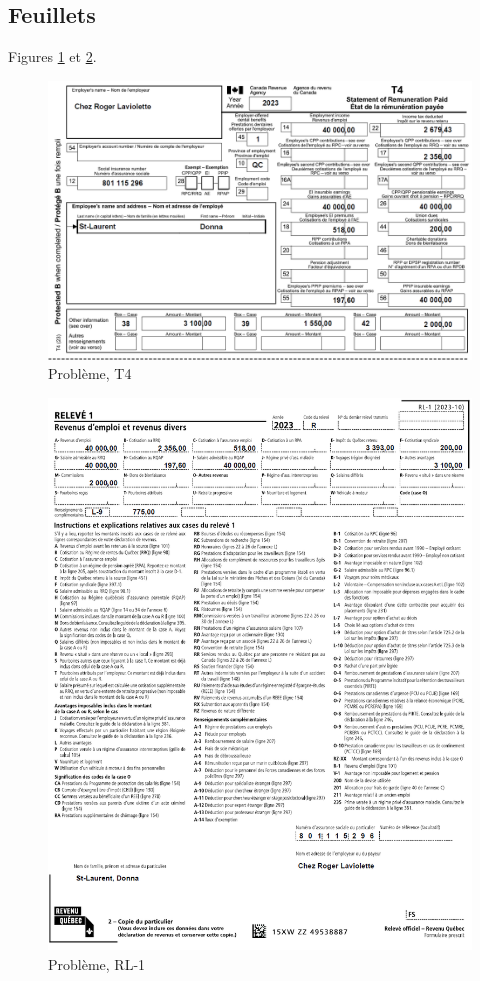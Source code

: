 \subsection{Feuillets}
Figures \ref{fig:chap3ProblemeT4} et \ref{fig:chap3ProblemeRL1}.
\begin{figure}
	\centering
	\includegraphics[width=.9\textwidth]{probleme/chapitre-3/T4.png}
	\caption{Problème, T4}
	\label{fig:chap3ProblemeT4}
\end{figure}
\begin{figure}
	\centering
	\includegraphics[width=.9\textwidth]{probleme/chapitre-3/RL1.png}
	\caption{Problème, RL-1}
	\label{fig:chap3ProblemeRL1}
\end{figure}



